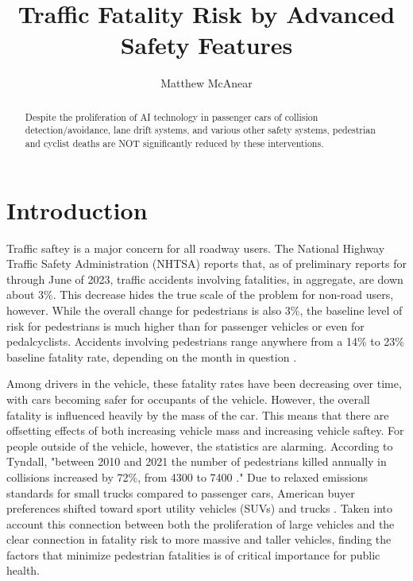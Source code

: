 \documentclass[12pt]{article}
\author{Matthew McAnear}
\title{Traffic Fatality Risk by Advanced Safety Features}
\begin{document}
\maketitle

\begin{abstract}
    Despite the proliferation of AI technology in passenger cars of collision detection/avoidance, lane drift systems, and
    various other safety systems, pedestrian and cyclist deaths are NOT significantly reduced by these
    interventions. 
\end{abstract}


\section{Introduction}

Traffic saftey is a major concern for all roadway users. The National Highway Traffic Safety Administration (NHTSA) reports
that, as of preliminary reports for through June of 2023, traffic accidents involving fatalities, in aggregate,
are down about 3\%. This decrease hides the true scale of the problem for non-road users, however. While the
overall change for pedestrians is also 3\%, the baseline level of risk for pedestrians is much higher than for 
passenger vehicles or even for pedalcyclists. Accidents involving pedestrians range anywhere from a 14\% to 
23\% baseline fatality rate, depending on the month in question \cite{national_highway_traffic_safety_administration_early_2024}.

Among drivers in the vehicle, these fatality rates have been decreasing over time, with cars becoming
safer for occupants of the vehicle. However, the overall fatality is influenced heavily by the mass of the 
car\cite{evans_car_1992}. This means that there are offsetting effects of both increasing vehicle mass and increasing 
vehicle saftey. For people outside of the vehicle, however, the statistics are alarming. According to Tyndall, 
"between 2010 and 2021 the number of pedestrians killed annually in collisions increased by 72\%, from 4300 to 
7400 \cite{tyndall_effect_2024}." Due to relaxed emissions standards for small trucks compared to passenger cars,
American buyer preferences shifted toward sport utility vehicles (SUVs) and trucks \cite{kovach_rise_2021}. Taken into 
account this connection between both the proliferation of large vehicles and the clear connection in fatality risk to
more massive and taller vehicles\cite{tyndall_effect_2024}, finding the factors that minimize pedestrian fatalities
is of critical importance for public health.
\end{document}
